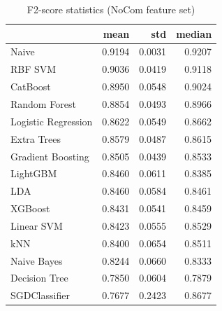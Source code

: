 \begin{table}
\caption{F2-score statistics (NoCom feature set)}
\label{tab:f2_NoCom_stats}
\begin{tabular}{lrrr}
\toprule
 & mean & std & median \\
\midrule
Naive & 0.9194 & 0.0031 & 0.9207 \\
RBF SVM & 0.9036 & 0.0419 & 0.9118 \\
CatBoost & 0.8950 & 0.0548 & 0.9024 \\
Random Forest & 0.8854 & 0.0493 & 0.8966 \\
Logistic Regression & 0.8622 & 0.0549 & 0.8662 \\
Extra Trees & 0.8579 & 0.0487 & 0.8615 \\
Gradient Boosting & 0.8505 & 0.0439 & 0.8533 \\
LightGBM & 0.8460 & 0.0611 & 0.8385 \\
LDA & 0.8460 & 0.0584 & 0.8461 \\
XGBoost & 0.8431 & 0.0541 & 0.8459 \\
Linear SVM & 0.8423 & 0.0555 & 0.8529 \\
kNN & 0.8400 & 0.0654 & 0.8511 \\
Naive Bayes & 0.8244 & 0.0660 & 0.8333 \\
Decision Tree & 0.7850 & 0.0604 & 0.7879 \\
SGDClassifier & 0.7677 & 0.2423 & 0.8677 \\
\bottomrule
\end{tabular}
\end{table}
